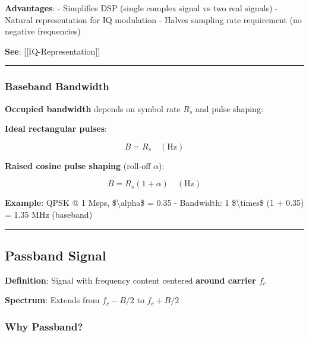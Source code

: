 \textbf{Advantages}: - Simplifies DSP (single complex signal vs two real
signals) - Natural representation for IQ modulation - Halves sampling
rate requirement (no negative frequencies)

\textbf{See}: {[}{[}IQ-Representation{]}{]}

\begin{center}\rule{0.5\linewidth}{0.5pt}\end{center}

\subsubsection{Baseband Bandwidth}\label{baseband-bandwidth}

\textbf{Occupied bandwidth} depends on symbol rate \(R_s\) and pulse
shaping:

\textbf{Ideal rectangular pulses}:

\[
B = R_s \quad (\text{Hz})
\]

\textbf{Raised cosine pulse shaping} (roll-off \(\alpha\)):

\[
B = R_s (1 + \alpha) \quad (\text{Hz})
\]

\textbf{Example}: QPSK @ 1 Msps, \$\textbackslash alpha\$ = 0.35 -
Bandwidth: 1 \$\textbackslash times\$ (1 + 0.35) = 1.35 MHz (baseband)

\begin{center}\rule{0.5\linewidth}{0.5pt}\end{center}

\subsection{Passband Signal}\label{passband-signal}

\textbf{Definition}: Signal with frequency content centered
\textbf{around carrier \(f_c\)}

\textbf{Spectrum}: Extends from \(f_c - B/2\) to \(f_c + B/2\)

\subsubsection{Why Passband?}\label{why-passband}

